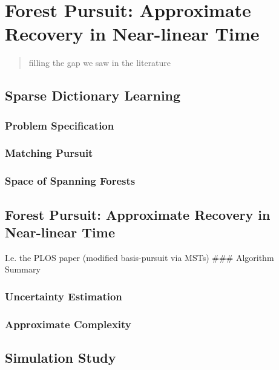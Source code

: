 \documentclass[%
	12pt,
		oneside,
		letterpaper
]{book}
\begin{document}
\chapter{Forest Pursuit: Approximate Recovery in Near-linear
Time}\label{forest-pursuit-approximate-recovery-in-near-linear-time}

\begin{quote}
filling the gap we saw in the literature
\end{quote}

\section{Sparse Dictionary Learning}\label{sparse-dictionary-learning}

\subsection{Problem Specification}\label{problem-specification}

\subsection{Matching Pursuit}\label{matching-pursuit}

\subsection{Space of Spanning Forests}\label{space-of-spanning-forests}

\section{Forest Pursuit: Approximate Recovery in Near-linear
Time}\label{forest-pursuit-approximate-recovery-in-near-linear-time-1}

I.e. the PLOS paper (modified basis-pursuit via MSTs) \#\#\# Algorithm
Summary

\subsection{Uncertainty Estimation}\label{uncertainty-estimation}

\subsection{Approximate Complexity}\label{approximate-complexity}

\section{Simulation Study}\label{simulation-study}
\end{document}
